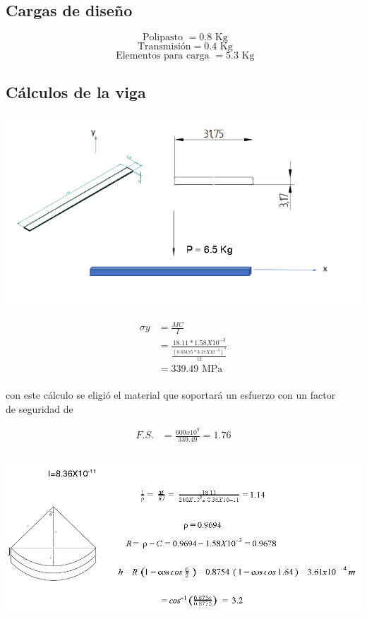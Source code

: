 \subsection{Cargas de diseño}


\begin{equation*}
\textrm{ Polipasto } = 0 .8 \textrm{ Kg}
\end{equation*}
\begin{equation*}
\textrm{ Transmisión} = 0.4 \textrm{ Kg}
\end{equation*}
\begin{equation*}
\textrm{ Elementos para carga } = 5.3 \textrm{ Kg}
\end{equation*}

\subsection{Cálculos de la viga} 

\begin{center}
\includegraphics[width=1\linewidth]{B/figs/C_1.png} 
\end{center}



\begin{align*}
\sigma y & = \frac{M C}{I} \\
        & = \frac{18.11 * 1.58X10^{-3}}{\frac{(0.03175 *  3.17X10^{-3})^{3}}{12}} \\
        & = 339.49 \textrm{ MPa}\\
\end{align*}


\textrm{ con este cálculo se eligió el material que soportará un esfuerzo con un factor}\\ 
\textrm{ de seguridad de}
  
  \begin{align*}
   F.S. & = \frac{600x10^{9}}{339.49} = 1.76 \\
\end{align*}


\begin{center}
\includegraphics[width=1\linewidth]{B/figs/C_21.png} 
\end{center}

